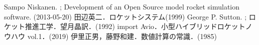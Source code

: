\documentclass[a4j,10pt]{jsarticle}
\begin{document}
% 
% 

\begin{thebibliography}{99}
		Sampo Niskanen. ; Development of an Open Source model rocket simulation software. (2013-05-20)
		田辺英二．ロケットシステム(1999)
		George P. Sutton. ; ロケット推進工学．望月晶訳．(1992)
		import Avio．小型ハイブリッドロケットノウハウ vol.1．(2019)
		伊里正男，藤野和建．数値計算の常識．(1985)
\end{thebibliography}
\end{document}

